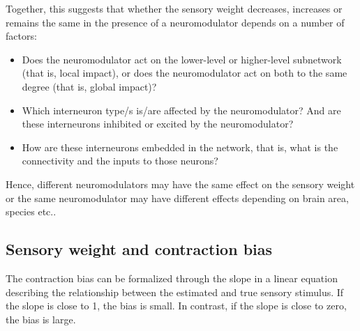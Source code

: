 \documentclass[10pt,a4paper,draft]{article}
\begin{document}
Together, this suggests that whether the sensory weight decreases, increases or remains the same in the presence of a neuromodulator depends on a number of factors:
%
\begin{itemize}
\item Does the neuromodulator act on the lower-level or higher-level subnetwork (that is, local impact), or does the neuromodulator act on both to the same degree (that is, global impact)?
\item Which interneuron type/s is/are affected by the neuromodulator? And are these interneurons inhibited or excited by the neuromodulator?
\item How are these interneurons embedded in the network, that is, what is the connectivity and the inputs to those neurons?
\end{itemize}
%
Hence, different neuromodulators may have the same effect on the sensory weight or the same neuromodulator may have different effects depending on brain area, species etc..


\subsection{Sensory weight and contraction bias}
%
The contraction bias can be formalized through the slope in a linear equation describing the relationship between the estimated and true sensory stimulus. If the slope is close to 1, the bias is small. In contrast, if the slope is close to zero, the bias is large. 
\end{document}
